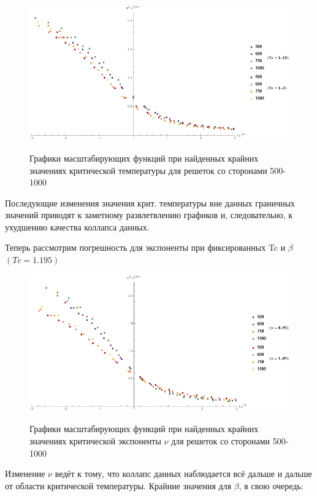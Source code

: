 \begin{figure}[!h]
    \centering
    \includegraphics[width=150mm]{Sections/Images/ErrTc2_2.png}
    \label{fig:ErrTc2_2}
    \caption{Графики масштабирующих функций при найденных крайних значениях критической температуры для решеток со сторонами 500-1000}
\end{figure}

Последующие изменения значения крит. температуры вне данных граничных значений приводят к заметному развлетвлению графиков и, следовательно, к ухудшению качества коллапса данных.

Теперь рассмотрим погрешность для экспоненты при фиксированных Tc и $\beta$ $(Tc = 1.195)$

\begin{figure}[!h]
    \centering
    \includegraphics[width=150mm]{Sections/Images/ErrV2_2.png}
    \label{fig:ErrV2_2}
    \caption{Графики масштабирующих функций при найденных крайних значениях критической экспоненты $\nu$ для решеток со сторонами 500-1000}
\end{figure}

Изменение $\nu$ ведёт к тому, что коллапс данных наблюдается всё дальше и дальше от области критической температуры. Крайние значения для $\beta$, в свою очередь:


